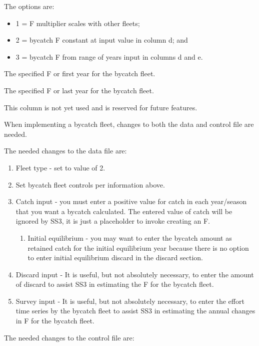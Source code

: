 The options are:  
  \begin{itemize}
  	\item 1 = F multiplier scales with other fleets;
  	\item 2 = bycatch F constant at input value in column d; and
  	\item 3 = bycatch F from range of years input in columns d and e.
  \end{itemize}

The specified F or first year for the bycatch fleet.

The specified F or last year for the bycatch fleet.

This column is not yet used and is reserved for future features.

When implementing a bycatch fleet, changes to both the data and control file are needed.  

The needed changes to the data file are:

\begin{enumerate}
	\item Fleet type - set to value of 2.
	\item Set bycatch fleet controls per information above.
	\item Catch input - you must enter a positive value for catch in each year/season that you want a bycatch calculated.  The entered value of catch will be ignored by SS3, it is just a placeholder to invoke creating an F.
	\begin{enumerate}
		\item Initial equilibrium - you may want to enter the bycatch amount as retained catch for the initial equilibrium year because there is no option to enter initial equilibrium discard in the discard section.
	\end{enumerate}	
	\item Discard input - It is useful, but not absolutely necessary, to enter the amount of discard to assist SS3 in estimating the F for the bycatch fleet.
	\item Survey input - It is useful, but not absolutely necessary, to enter the effort time series by the bycatch fleet to assist SS3 in estimating the annual changes in F for the bycatch fleet.
\end{enumerate}

The needed changes to the control file are:

